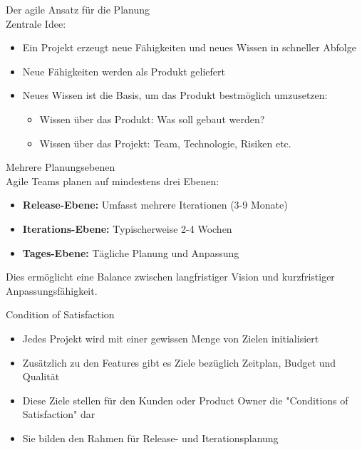 \begin{concept}{Der agile Ansatz für die Planung}\\
    Zentrale Idee:
    \begin{itemize}
        \item Ein Projekt erzeugt neue Fähigkeiten und neues Wissen in schneller Abfolge
        \item Neue Fähigkeiten werden als Produkt geliefert
        \item Neues Wissen ist die Basis, um das Produkt bestmöglich umzusetzen:
        \begin{itemize}
            \item Wissen über das Produkt: Was soll gebaut werden?
            \item Wissen über das Projekt: Team, Technologie, Risiken etc.
        \end{itemize}
    \end{itemize}
\end{concept}

\begin{concept}{Mehrere Planungsebenen}\\
    Agile Teams planen auf mindestens drei Ebenen:
    \begin{itemize}
        \item \textbf{Release-Ebene:} Umfasst mehrere Iterationen (3-9 Monate)
        \item \textbf{Iterations-Ebene:} Typischerweise 2-4 Wochen
        \item \textbf{Tages-Ebene:} Tägliche Planung und Anpassung
    \end{itemize}
    Dies ermöglicht eine Balance zwischen langfristiger Vision und kurzfristiger Anpassungsfähigkeit.
\end{concept}

\begin{concept}{Condition of Satisfaction}\\
    \begin{itemize}
        \item Jedes Projekt wird mit einer gewissen Menge von Zielen initialisiert
        \item Zusätzlich zu den Features gibt es Ziele bezüglich Zeitplan, Budget und Qualität
        \item Diese Ziele stellen für den Kunden oder Product Owner die "Conditions of Satisfaction" dar
        \item Sie bilden den Rahmen für Release- und Iterationsplanung
    \end{itemize}
\end{concept}

